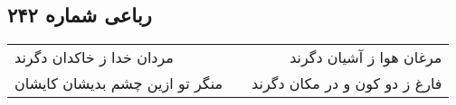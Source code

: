 \begin{center}
\section*{رباعی شماره ۲۴۲}
\label{sec:sh242}
\begin{longtable}{l p{0.5cm} r}
مردان خدا ز خاکدان دگرند
&&
مرغان هوا ز آشیان دگرند
\\
منگر تو ازین چشم بدیشان کایشان
&&
فارغ ز دو کون و در مکان دگرند
\\
\end{longtable}
\end{center}
